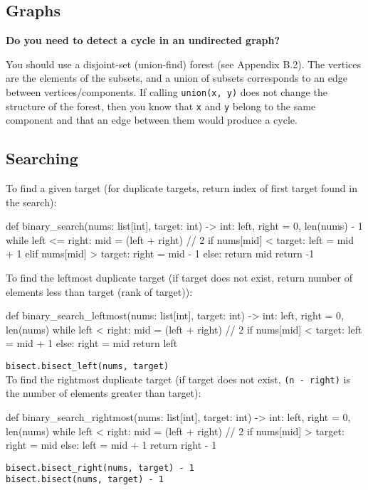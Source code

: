 \documentclass[12pt]{article}
\begin{document}
\subsection*{Graphs}
\begin{adjustwidth}{2em}{0pt}
\textbf{Do you need to detect a cycle in an undirected graph?} \medskip

You should use a disjoint-set (union-find) forest (see Appendix B.2). The vertices are the elements of the subsets, and a union of subsets corresponds to an edge between vertices/components. If calling \texttt{union(x, y)} does not change the structure of the forest, then you know that \texttt{x} and \texttt{y} belong to the same component and that an edge between them would produce a cycle.
\end{adjustwidth}

\subsection*{Searching}

\begin{adjustwidth}{2em}{0pt}
To find a given target (for duplicate targets, return index of first target found in the search):
\begin{python}
def binary_search(nums: list[int], target: int) -> int:
    left, right = 0, len(nums) - 1
    while left <= right:
        mid = (left + right) // 2
        if nums[mid] < target:
            left = mid + 1
        elif nums[mid] > target:
            right = mid - 1
        else:
            return mid
    return -1
\end{python}
\bigskip

To find the leftmost duplicate target (if target does not exist, return number of elements less than target (rank of target)):
\begin{python}
def binary_search_leftmost(nums: list[int], target: int) -> int:
    left, right = 0, len(nums)
    while left < right:
        mid = (left + right) // 2
        if nums[mid] < target:
            left = mid + 1
        else:
            right = mid
    return left
\end{python}
\texttt{bisect.bisect\_left(nums, target)} \\

To find the rightmost duplicate target (if target does not exist, \texttt{(n - right)} is the number of elements greater than target):
\begin{python}
def binary_search_rightmost(nums: list[int], target: int) -> int:
    left, right = 0, len(nums)
    while left < right:
        mid = (left + right) // 2
        if nums[mid] > target:
            right = mid
        else:
            left = mid + 1
    return right - 1
\end{python}
\texttt{bisect.bisect\_right(nums, target) - 1} \\
\texttt{bisect.bisect(nums, target) - 1}
\end{adjustwidth}
\end{document}
